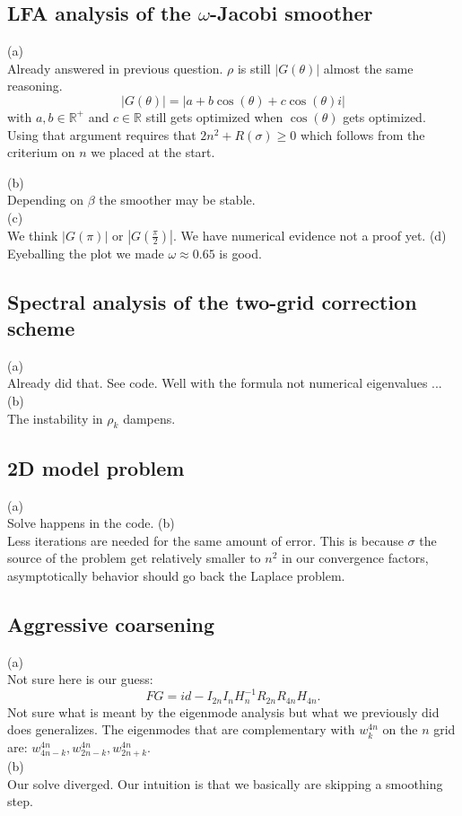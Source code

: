 \documentclass[a4paper,12pt]{article}
\begin{document}
\subsection{LFA analysis of the $\omega$-Jacobi smoother}
(a) \\
Already answered in previous question. $\rho$ is still $|G(\theta)|$ almost the same reasoning.
\begin{equation}
    |G(\theta)| = |a + b \cos(\theta) + c \cos(\theta)i|
\end{equation}
with $a,b \in \mathbb{R}^{+}$ and $c \in  \mathbb{R}$ still gets optimized when $\cos\left(\theta\right)$
gets optimized. Using that argument requires that $2n^{2}+R(\sigma)\geq 0$ which follows from the criterium on
$n$ we placed at the start.

(b) \\
Depending on $\beta$ the smoother may be stable. \\
(c) \\
We think $|G(\pi)|$ or $|G(\frac{\pi}{2})|$. We have numerical evidence not a proof yet.
(d) \\
Eyeballing the plot we made $\omega \approx 0.65$ is good.

\subsection{Spectral analysis of the two-grid correction scheme}
(a) \\
Already did that. See code. Well with the formula not numerical eigenvalues ... \\
(b) \\
The instability in $\rho_{k}$ dampens.


\subsection{2D model problem}
(a) \\
Solve happens in the code.
(b) \\
Less iterations are needed for the same amount of error. This is because
$\sigma$ the source of the problem get relatively smaller to $n^{2}$ in
our convergence factors, asymptotically behavior should go back the
Laplace problem.

\subsection{Aggressive coarsening}
(a)\\
Not sure here is our guess:
\begin{equation}
    FG = id -I_{2n} I_{n} H_{n}^{-1} R_{2n} R_{4n} H_{4n}.
\end{equation}
Not sure what is meant by the eigenmode analysis but what we previously
did does generalizes. The eigenmodes that are complementary with $w_{k}^{4n}$ on
the $n$ grid are: $w_{4n-k}^{4n},w_{2n-k}^{4n},w_{2n+k}^{4n}$. \\
(b)\\
Our solve diverged. Our intuition is that we basically are skipping a smoothing step.
\end{document}
